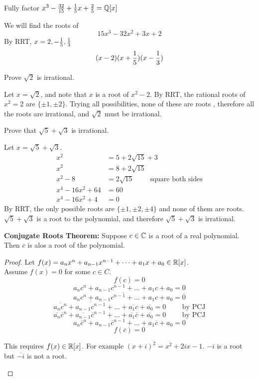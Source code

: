 \documentclass[english, 12pt]{article}
\begin{document}
\begin{exmp}
Fully factor $x^3 - \frac{32}{15} + \frac{1}{5}x + \frac{2}{5} = {\mathbb{Q}}\lbrack x \rbrack$
\begin{sol}
We will find the roots of 
\[ 15x^3 - 32x^2 + 3x + 2\]
By RRT, $x = 2, -\frac{1}{5}, \frac{1}{3}$
\[ (x-2)(x+\frac{1}{5})(x - \frac{1}{3})\]
\end{sol}
\end{exmp}
\begin{exercise}
Prove $\sqrt{2}$ is irrational.
\begin{sol}
Let $x = \sqrt{2}$, and note that $x$ is a root of $x^2 -2$. By RRT, the rational roots of $x^2 =2$ are $\{\pm 1, \pm 2\}$. Trying all possibilities, none of these are roots , therefore all the roots are irrational, and $\sqrt{2}$ must be irrational.
\end{sol}
\end{exercise}
\begin{exercise}
Prove that $\sqrt 5 + \sqrt 3$ is irrational.
\begin{sol}
Let $x = \sqrt{5} + \sqrt{3}$. 
\begin{align*}
x^2 &= 5 + 2 \sqrt{15} + 3\\
x^2 &= 8 + 2 \sqrt{15}\\
x^2 - 8 &= 2 \sqrt{15}\qquad \text{ square both sides}\\
 x^4 - 16x^2 + 64 &= 60\\
 x^4 - 16x^2 + 4 &= 0
 \end{align*}
 By RRT, the only possible roots are $\{\pm 1, \pm 2, \pm 4\}$ and none of them are roots. $\sqrt 5 + \sqrt 3$ is a root to the polynomial, and therefore $\sqrt 5 + \sqrt 3$ is irrational.
\end{sol}
\end{exercise}
\begin{thrm}[CJRT]
\textbf{Conjugate Roots Theorem:} Suppose $c \in {\mathbb{C}}$ is a root of a real polynomial. Then $\overline{c}$ is alos a root of the polynomial.
\begin{proof}
Let $f(x) = a_{n} x^n + a_{n-1}x^{n-1} + \dots + a_{1} x + a_{0} \in {\mathbb{R}}\lbrack x \rbrack$.\\
Assume $f(x) = 0$ for some $c \in C$.
\[f(c) = 0\]
\[ a_{n} c^n + a_{n-1}c^{n-1} + \dots + a_{1} c + a_{0} = 0\]
\[\overline{a_{n} c^n + a_{n-1}c^{n-1} + \dots + a_{1} c + a_{0}} = \overline 0\]
\[\overline{a_{n} c^n} + \overline{a_{n-1} c^{n-1}} + \dots + \overline{a_{1}  c} + \overline{a_{0}} = 0 \qquad \text{ by PCJ}\]
\[\overline{a_{n}} \overline c^n + \overline{a_{n-1}} \overline c^{n-1} + \dots + \overline{a_{1}} \overline c + \overline{a_{0}} = 0 \qquad \text{ by PCJ}\]
\[a_{n} \overline c^n + a_{n-1} \overline c^{n-1} + \dots + a_{1} \overline c + a_{0} = 0\]
\[ f(\overline c) = 0\]
\begin{note}
This requires $f(x) \in {\mathbb{R}}\lbrack x \rbrack$. For example $(x+i)^2 = x^2 + 2ix - 1$. $-i$ is a root but $\overline{-i}$ is not a root.
\end{note}
\end{proof}
\end{thrm}
\end{document}
